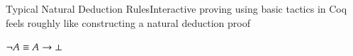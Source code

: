 \begin{frame}[shrink]{Typical Natural Deduction Rules}{Interactive proving using basic tactics in Coq feels roughly like constructing a natural deduction proof}

\begin{unnamedCalculus}

\vspace{1em}

\s\s
{}
\s\s
{}
\s\s
{}

\vspace{2em}

\s\s
{}
\s\s
{}
\s\s
{}

\vspace{2em}

\s\s
{}
\s\s
{}
\s\s
{}

\vspace{2em}

\s
{}
\s
{}
\s\s
{}
\s
{}

\vspace{1em}

\s\s\s\s
$\neg A \equiv A \rightarrow \bot$ 
\s\s\s 
\alert{}

\vspace{1em}

\end{unnamedCalculus}

\end{frame}


